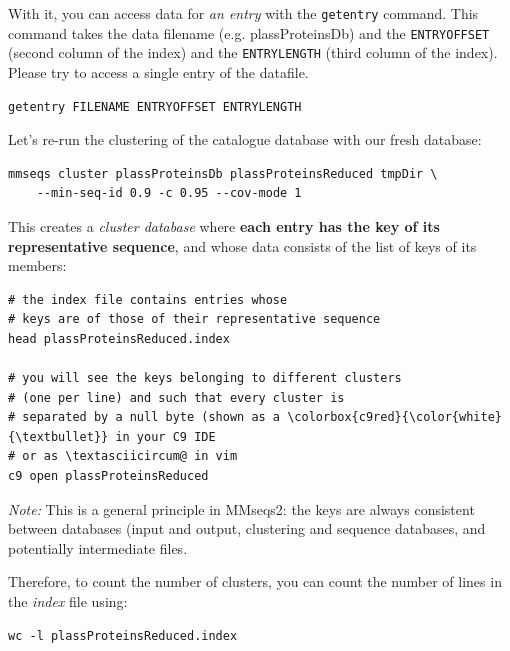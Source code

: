 \documentclass{scrartcl}
\begin{document}
With it, you can access data for \textit{an entry} with the \texttt{getentry} command. This command takes the data filename (e.g. plassProteinsDb) and the \texttt{ENTRYOFFSET} (second column of the index) and the \texttt{ENTRYLENGTH} (third column of the index). Please try to access a single entry of the datafile. 

\begin{verbatim}
getentry FILENAME ENTRYOFFSET ENTRYLENGTH 
\end{verbatim}


Let's re-run the clustering of the catalogue database with our fresh database:
\begin{verbatim}
mmseqs cluster plassProteinsDb plassProteinsReduced tmpDir \
    --min-seq-id 0.9 -c 0.95 --cov-mode 1 
\end{verbatim}

This creates a \textit{cluster database} where \textbf{each entry has the key of its representative sequence}, and whose data consists of the list of keys of its members:
\begin{verbatim}
# the index file contains entries whose
# keys are of those of their representative sequence
head plassProteinsReduced.index 

# you will see the keys belonging to different clusters
# (one per line) and such that every cluster is
# separated by a null byte (shown as a \colorbox{c9red}{\color{white}{\textbullet}} in your C9 IDE
# or as \textasciicircum@ in vim
c9 open plassProteinsReduced
\end{verbatim}

\textit{Note:} This is a general principle in MMseqs2: the keys are always consistent between databases (input and output, clustering and sequence databases, and potentially intermediate files.

Therefore, to count the number of clusters, you can count the number of lines in the \textit{index} file using:
\begin{verbatim}
wc -l plassProteinsReduced.index
\end{verbatim}
\end{document}
